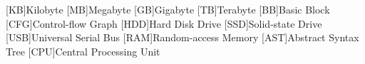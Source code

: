 \chapter*{\acrolisting}
\begin{acronym}
    [KB]{Kilobyte}
    [MB]{Megabyte}
    [GB]{Gigabyte}
    [TB]{Terabyte}
    [BB]{Basic Block}
    [CFG]{Control-flow Graph}
    [HDD]{Hard Disk Drive}
    [SSD]{Solid-state Drive}
    [USB]{Universal Serial Bus}
    [RAM]{Random-access Memory}
    [AST]{Abstract Syntax Tree}
    [CPU]{Central Processing Unit}
\end{acronym}
